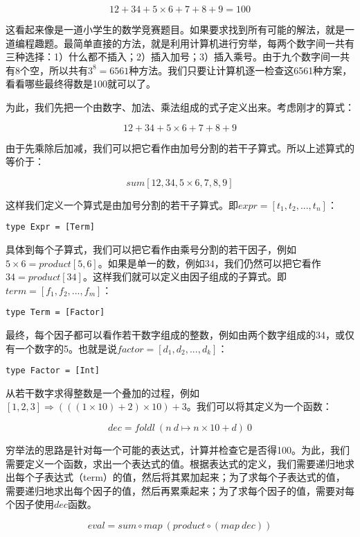 \documentclass{article}
\begin{document}
\[
12 + 34 + 5 \times 6 + 7 + 8 + 9 = 100
\]

这看起来像是一道小学生的数学竞赛题目。如果要求找到所有可能的解法，就是一道编程趣题。最简单直接的方法，就是利用计算机进行穷举，每两个数字间一共有三种选择：1）什么都不插入；2）插入加号；3）插入乘号。由于九个数字间一共有8个空，所以共有$3^8 = 6561$种方法。我们只要让计算机逐一检查这6561种方案，看看哪些最终得数是100就可以了。

为此，我们先把一个由数字、加法、乘法组成的式子定义出来。考虑刚才的算式：

\[
12 + 34 + 5 \times 6 + 7 + 8 + 9
\]

由于先乘除后加减，我们可以把它看作由加号分割的若干子算式。所以上述算式的等价于：

\[
sum [12, 34, 5 \times 6, 7, 8, 9]
\]

这样我们定义一个算式是由加号分割的若干子算式。即$expr = [t_1, t_2, ..., t_n]$：

\lstset{frame = none}
\begin{lstlisting}
type Expr = [Term]
\end{lstlisting}

具体到每个子算式，我们可以把它看作由乘号分割的若干因子，例如$5 \times 6 = product [5, 6]$。如果是单一的数，例如$34$，我们仍然可以把它看作$34 = product [34]$。这样我们就可以定义由因子组成的子算式。即$term = [f_1, f_2, ..., f_m]$：

\begin{lstlisting}
type Term = [Factor]
\end{lstlisting}

最终，每个因子都可以看作若干数字组成的整数，例如由两个数字组成的34，或仅有一个数字的5。也就是说$factor = [d_1, d_2, ..., d_k]$：

\begin{lstlisting}
type Factor = [Int]
\end{lstlisting}

从若干数字求得整数是一个叠加的过程，例如$[1, 2, 3] \Rightarrow (((1 \times 10) + 2) \times 10) + 3$。我们可以将其定义为一个函数：

\[
dec = foldl\ (n\ d \mapsto n \times 10 + d)\ 0
\]

穷举法的思路是针对每一个可能的表达式，计算并检查它是否得100。为此，我们需要定义一个函数，求出一个表达式的值。根据表达式的定义，我们需要递归地求出每个子表达式（term）的值，然后将其累加起来；为了求每个子表达式的值，需要递归地求出每个因子的值，然后再累乘起来；为了求每个因子的值，需要对每个因子使用$dec$函数。

\[
eval = sum \circ map\ (product \circ (map\ dec))
\]
\end{document}
